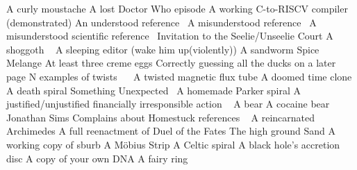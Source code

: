 \begin{multicols}{2}
\begin{small}
\begin{tabbing}
          {A curly moustache}
           {A lost Doctor Who episode}
           {A working C-to-RISCV compiler (demonstrated)}
           {An understood reference~\E}
          {A misunderstood reference~\E}
         {A misunderstood scientific reference~\E}
          {Invitation to the Seelie/Unseelie Court}
           {A shoggoth ~\E}
            {A sleeping editor (wake him up(violently))}
            {A sandworm}
            {Spice Melange}
           {At least three creme eggs }
           {Correctly guessing all the ducks on a later page}
        {N examples of twists ~\FD ~\M}
            {A twisted magnetic flux tube}
            {A doomed time clone}
            {A death spiral}
             {Something Unexpected~\FD}
            {A homemade Parker spiral}
             {A justified/unjustified financially irresponsible action ~\FD}
              {A bear}
              {A cocaine bear}
            {Jonathan Sims}
             {Complains about Homestuck references ~\E}
             {A reincarnated Archimedes}
            {A full reenactment of Duel of the Fates}
               {The high ground}
            {Sand}
             {A working copy of sburb}
            {A Möbius Strip}
              {A Celtic spiral}
             {A black hole's accretion disc}
            {A copy of your own DNA}
            {A fairy ring}

\end{tabbing}
\end{small}
\end{multicols}
